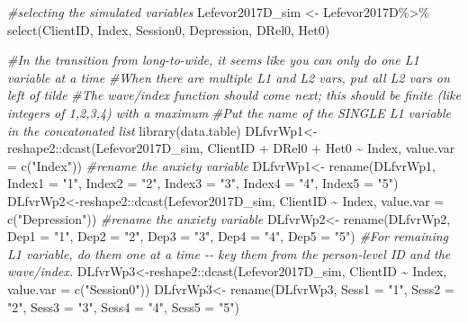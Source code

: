 \documentclass[
  english,
]{book}
\newenvironment{Shaded}{\begin{snugshade}}{\end{snugshade}}
\newcommand{\AttributeTok}[1]{\textcolor[rgb]{0.77,0.63,0.00}{#1}}
\newcommand{\CommentTok}[1]{\textcolor[rgb]{0.56,0.35,0.01}{\textit{#1}}}
\newcommand{\FunctionTok}[1]{\textcolor[rgb]{0.00,0.00,0.00}{#1}}
\newcommand{\NormalTok}[1]{#1}
\newcommand{\OtherTok}[1]{\textcolor[rgb]{0.56,0.35,0.01}{#1}}
\newcommand{\SpecialCharTok}[1]{\textcolor[rgb]{0.00,0.00,0.00}{#1}}
\newcommand{\StringTok}[1]{\textcolor[rgb]{0.31,0.60,0.02}{#1}}
\begin{document}
\begin{Shaded}
\begin{Highlighting}[]
\CommentTok{\#selecting the simulated variables}
\NormalTok{Lefevor2017D\_sim }\OtherTok{\textless{}{-}}\NormalTok{ Lefevor2017D}\SpecialCharTok{\%\textgreater{}\%}
  \FunctionTok{select}\NormalTok{(ClientID, Index, Session0, Depression, DRel0, Het0)}

\CommentTok{\#In the transition from long{-}to{-}wide, it seems like you can only do one L1 variable at a time}
\CommentTok{\#When there are multiple L1 and L2 vars, put all L2 vars on left of tilde}
\CommentTok{\#The wave/index function should come next; this should be finite (like integers of 1,2,3,4) with a maximum}
\CommentTok{\#Put the name of the SINGLE L1 variable in the concatonated list}
\FunctionTok{library}\NormalTok{(data.table)}
\NormalTok{DLfvrWp1}\OtherTok{\textless{}{-}}\NormalTok{reshape2}\SpecialCharTok{::}\FunctionTok{dcast}\NormalTok{(Lefevor2017D\_sim, ClientID }\SpecialCharTok{+}\NormalTok{ DRel0 }\SpecialCharTok{+}\NormalTok{ Het0 }\SpecialCharTok{\textasciitilde{}}\NormalTok{ Index, }\AttributeTok{value.var =} \FunctionTok{c}\NormalTok{(}\StringTok{"Index"}\NormalTok{))}
\CommentTok{\#rename the anxiety variable}
\NormalTok{DLfvrWp1}\OtherTok{\textless{}{-}}  \FunctionTok{rename}\NormalTok{(DLfvrWp1, }\AttributeTok{Index1 =} \StringTok{"1"}\NormalTok{, }\AttributeTok{Index2 =} \StringTok{"2"}\NormalTok{, }\AttributeTok{Index3 =} \StringTok{"3"}\NormalTok{, }\AttributeTok{Index4 =} \StringTok{"4"}\NormalTok{, }\AttributeTok{Index5 =} \StringTok{"5"}\NormalTok{)}
\NormalTok{DLfvrWp2}\OtherTok{\textless{}{-}}\NormalTok{reshape2}\SpecialCharTok{::}\FunctionTok{dcast}\NormalTok{(Lefevor2017D\_sim, ClientID }\SpecialCharTok{\textasciitilde{}}\NormalTok{ Index, }\AttributeTok{value.var =} \FunctionTok{c}\NormalTok{(}\StringTok{"Depression"}\NormalTok{))}
\CommentTok{\#rename the anxiety variable}
\NormalTok{DLfvrWp2}\OtherTok{\textless{}{-}}  \FunctionTok{rename}\NormalTok{(DLfvrWp2, }\AttributeTok{Dep1 =} \StringTok{"1"}\NormalTok{, }\AttributeTok{Dep2 =} \StringTok{"2"}\NormalTok{, }\AttributeTok{Dep3 =} \StringTok{"3"}\NormalTok{, }\AttributeTok{Dep4 =} \StringTok{"4"}\NormalTok{, }\AttributeTok{Dep5 =} \StringTok{"5"}\NormalTok{)}
\CommentTok{\#For remaining L1 variable, do them one at a time {-}{-} key them from the person{-}level ID and the wave/index.}
\NormalTok{DLfvrWp3}\OtherTok{\textless{}{-}}\NormalTok{reshape2}\SpecialCharTok{::}\FunctionTok{dcast}\NormalTok{(Lefevor2017D\_sim, ClientID }\SpecialCharTok{\textasciitilde{}}\NormalTok{ Index, }\AttributeTok{value.var =} \FunctionTok{c}\NormalTok{(}\StringTok{"Session0"}\NormalTok{))}
\NormalTok{DLfvrWp3}\OtherTok{\textless{}{-}}  \FunctionTok{rename}\NormalTok{(DLfvrWp3, }\AttributeTok{Sess1 =} \StringTok{"1"}\NormalTok{, }\AttributeTok{Sess2 =} \StringTok{"2"}\NormalTok{, }\AttributeTok{Sess3 =} \StringTok{"3"}\NormalTok{, }\AttributeTok{Sess4 =} \StringTok{"4"}\NormalTok{, }\AttributeTok{Sess5 =} \StringTok{"5"}\NormalTok{)}

\end{Highlighting}
\end{Shaded}
\end{document}
